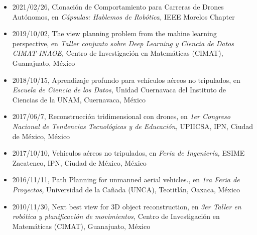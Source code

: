 \begin{itemize} 
\item 2021/02/26, Clonación de Comportamiento para Carreras de Drones Autónomos, en \textit{ Cápsulas: Hablemos de Robótica,} IEEE Morelos Chapter 
\item 2019/10/02, The view planning problem from the mahine learning perspective, en \textit{ Taller conjunto sobre Deep Learning y Ciencia de Datos CIMAT-INAOE,} Centro de Investigación en Matemáticas (CIMAT), Guanajuato, México 
\item 2018/10/15, Aprendizaje profundo para vehículos aéreos no tripulados, en \textit{ Escuela de Ciencia de los Datos,} Unidad Cuernavaca del Instituto de Ciencias de la UNAM, Cuernavaca, México 
\item 2017/06/7, Reconstrucción tridimensional con drones, en \textit{ 1er Congreso Nacional de Tendencias Tecnológicas y de Educación,} UPIICSA, IPN, Ciudad de México, México 
\item 2017/10/10, Vehiculos aéreos no tripulados, en \textit{ Feria de Ingeniería,} ESIME Zacatenco, IPN, Ciudad de México, México 
\item 2016/11/11, Path Planning for unmanned aerial vehicles., en \textit{ 1ra Feria de Proyectos,} Universidad de la Cañada (UNCA), Teotitlán, Oaxaca, México 
\item 2010/11/30, Next best view for 3D object reconstruction, en \textit{ 3er Taller en robótica y planificación de movimientos,} Centro de Investigación en Matemáticas (CIMAT), Guanajuato, México 
\end{itemize} 
